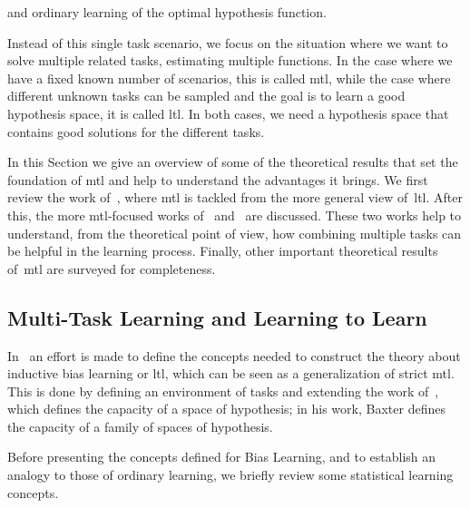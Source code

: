 and ordinary learning of the optimal hypothesis function.

Instead of this single task scenario, we focus on the situation where we want to solve multiple related tasks, estimating multiple functions. In the case where we have a fixed known number of scenarios, this is called \acrfull{mtl}, while the case where different unknown tasks can be sampled and the goal is to learn a good hypothesis space, it is called \acrfull{ltl}. In both cases, we need a hypothesis space that contains good solutions for the different tasks.

In this Section we give an overview of some of the theoretical results that set the foundation of \acrshort{mtl} and help to understand the advantages it brings. We first review the work of~\citet{baxter2000model}, where \acrshort{mtl} is tackled from the more general view of~\acrshort{ltl}. After this, the more \acrshort{mtl}-focused works of~\citet{Ben-DavidB08} and~\citet{Ben-DavidS03} are discussed.
%
These two works help to understand, from the theoretical point of view, how combining multiple tasks can be helpful in the learning process.
%
Finally, other important theoretical results of~\acrshort{mtl} are surveyed for completeness.
\subsection{Multi-Task Learning and Learning to Learn} %
%
In~\cite{baxter2000model} an effort is made to define the concepts needed to construct the theory about inductive bias learning or \acrshort{ltl}, which can be seen as a generalization of strict \acrshort{mtl}. This is done by defining an environment of tasks and extending the work of~\cite{Vapnik00}, which defines the capacity of a space of hypothesis; in his work, Baxter defines the capacity of a family of spaces of hypothesis.

Before presenting the concepts defined for Bias Learning, and to establish an analogy to those of ordinary learning, we briefly review some statistical learning concepts.
